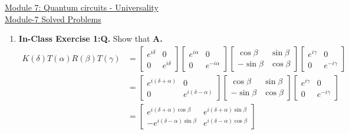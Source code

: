 \documentclass[main.tex]{subfiles}
\begin{document}
\href{https://www2.seas.gwu.edu/~simhaweb/quantum/modules/module7/module7.html}{Module 7: Quantum circuits - Universality}\\
\href{https://www2.seas.gwu.edu/~simhaweb/quantum/modules/module7/problems7.html}{Module-7 Solved Problems}

\begin{enumerate}

\item[] \textbf{In-Class Exercise 1:}\textbf{Q.} Show that \textbf{A.}
\begin{align*}
     K(\delta) T(\alpha) R(\beta) T(\gamma) & = \left[\begin{array}{cc}e^{i\delta}&0\\0&e^{i\delta}\end{array}\right]
                                            \left[\begin{array}{cc}e^{i\alpha}&0\\0&e^{-i\alpha}\end{array}\right]
                                            \left[\begin{array}{cc}\cos\beta&\sin\beta\\-\sin\beta&\cos\beta\end{array}\right]
                                            \left[\begin{array}{cc}e^{i\gamma}&0\\0&e^{-i\gamma}\end{array}\right]\\
                                            & = \left[\begin{array}{cc}e^{i(\delta+\alpha)}&0\\0&e^{i(\delta-\alpha)}\end{array}\right]
                                            \left[\begin{array}{cc}\cos\beta&\sin\beta\\-\sin\beta&\cos\beta\end{array}\right]
                                            \left[\begin{array}{cc}e^{i\gamma}&0\\0&e^{-i\gamma}\end{array}\right]\\
                                            & = \left[\begin{array}{ll}e^{i(\delta+\alpha)\cos\beta}& e^{i(\delta+\alpha)\sin\beta}\\
                                            -e^{i(\delta-\alpha)\sin\beta}&e^{i(\delta-\alpha)\cos\beta}\end{array}\right]

\end{align*}
\end{enumerate}
\end{document}
